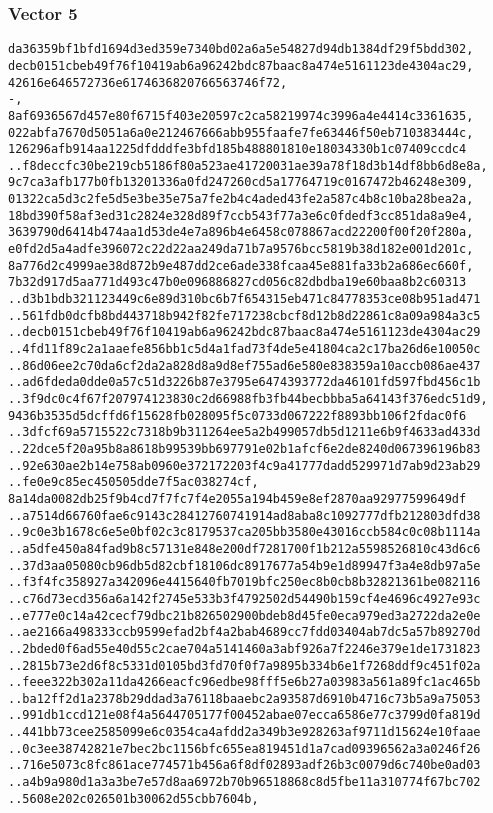 \documentclass[
]{article}
\begin{document}
\hypertarget{vector-5-2}{%
\subsubsection{Vector 5}\label{vector-5-2}}

\begin{verbatim}
da36359bf1bfd1694d3ed359e7340bd02a6a5e54827d94db1384df29f5bdd302,
decb0151cbeb49f76f10419ab6a96242bdc87baac8a474e5161123de4304ac29,
42616e646572736e6174636820766563746f72,
-,
8af6936567d457e80f6715f403e20597c2ca58219974c3996a4e4414c3361635,
022abfa7670d5051a6a0e212467666abb955faafe7fe63446f50eb710383444c,
126296afb914aa1225dfdddfe3bfd185b488801810e18034330b1c07409ccdc4
..f8deccfc30be219cb5186f80a523ae41720031ae39a78f18d3b14df8bb6d8e8a,
9c7ca3afb177b0fb13201336a0fd247260cd5a17764719c0167472b46248e309,
01322ca5d3c2fe5d5e3be35e75a7fe2b4c4aded43fe2a587c4b8c10ba28bea2a,
18bd390f58af3ed31c2824e328d89f7ccb543f77a3e6c0fdedf3cc851da8a9e4,
3639790d6414b474aa1d53de4e7a896b4e6458c078867acd22200f00f20f280a,
e0fd2d5a4adfe396072c22d22aa249da71b7a9576bcc5819b38d182e001d201c,
8a776d2c4999ae38d872b9e487dd2ce6ade338fcaa45e881fa33b2a686ec660f,
7b32d917d5aa771d493c47b0e096886827cd056c82dbdba19e60baa8b2c60313
..d3b1bdb321123449c6e89d310bc6b7f654315eb471c84778353ce08b951ad471
..561fdb0dcfb8bd443718b942f82fe717238cbcf8d12b8d22861c8a09a984a3c5
..decb0151cbeb49f76f10419ab6a96242bdc87baac8a474e5161123de4304ac29
..4fd11f89c2a1aaefe856bb1c5d4a1fad73f4de5e41804ca2c17ba26d6e10050c
..86d06ee2c70da6cf2da2a828d8a9d8ef755ad6e580e838359a10accb086ae437
..ad6fdeda0dde0a57c51d3226b87e3795e6474393772da46101fd597fbd456c1b
..3f9dc0c4f67f207974123830c2d66988fb3fb44becbbba5a64143f376edc51d9,
9436b3535d5dcffd6f15628fb028095f5c0733d067222f8893bb106f2fdac0f6
..3dfcf69a5715522c7318b9b311264ee5a2b499057db5d1211e6b9f4633ad433d
..22dce5f20a95b8a8618b99539bb697791e02b1afcf6e2de8240d067396196b83
..92e630ae2b14e758ab0960e372172203f4c9a41777dadd529971d7ab9d23ab29
..fe0e9c85ec450505dde7f5ac038274cf,
8a14da0082db25f9b4cd7f7fc7f4e2055a194b459e8ef2870aa92977599649df
..a7514d66760fae6c9143c28412760741914ad8aba8c1092777dfb212803dfd38
..9c0e3b1678c6e5e0bf02c3c8179537ca205bb3580e43016ccb584c0c08b1114a
..a5dfe450a84fad9b8c57131e848e200df7281700f1b212a5598526810c43d6c6
..37d3aa05080cb96db5d82cbf18106dc8917677a54b9e1d89947f3a4e8db97a5e
..f3f4fc358927a342096e4415640fb7019bfc250ec8b0cb8b32821361be082116
..c76d73ecd356a6a142f2745e533b3f4792502d54490b159cf4e4696c4927e93c
..e777e0c14a42cecf79dbc21b826502900bdeb8d45fe0eca979ed3a2722da2e0e
..ae2166a498333ccb9599efad2bf4a2bab4689cc7fdd03404ab7dc5a57b89270d
..2bded0f6ad55e40d55c2cae704a5141460a3abf926a7f2246e379e1de1731823
..2815b73e2d6f8c5331d0105bd3fd70f0f7a9895b334b6e1f7268ddf9c451f02a
..feee322b302a11da4266eacfc96edbe98fff5e6b27a03983a561a89fc1ac465b
..ba12ff2d1a2378b29ddad3a76118baaebc2a93587d6910b4716c73b5a9a75053
..991db1ccd121e08f4a5644705177f00452abae07ecca6586e77c3799d0fa819d
..441bb73cee2585099e6c0354ca4afdd2a349b3e928263af9711d15624e10faae
..0c3ee38742821e7bec2bc1156bfc655ea819451d1a7cad09396562a3a0246f26
..716e5073c8fc861ace774571b456a6f8df02893adf26b3c0079d6c740be0ad03
..a4b9a980d1a3a3be7e57d8aa6972b70b96518868c8d5fbe11a310774f67bc702
..5608e202c026501b30062d55cbb7604b,
\end{verbatim}
\end{document}
